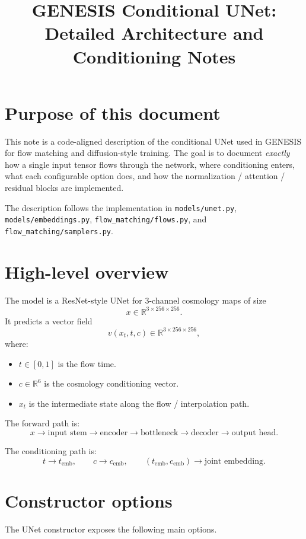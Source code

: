 \documentclass[11pt]{article}
\title{GENESIS Conditional UNet: Detailed Architecture and Conditioning Notes}
\author{}
\date{}
\begin{document}
\maketitle
\tableofcontents
\newpage

\section{Purpose of this document}
This note is a code-aligned description of the conditional UNet used in GENESIS for
flow matching and diffusion-style training. The goal is to document \emph{exactly}
how a single input tensor flows through the network, where conditioning enters,
what each configurable option does, and how the normalization / attention / residual
blocks are implemented.

The description follows the implementation in \texttt{models/unet.py},
\texttt{models/embeddings.py}, \texttt{flow\_matching/flows.py}, and
\texttt{flow\_matching/samplers.py}.

\section{High-level overview}
The model is a ResNet-style UNet for 3-channel cosmology maps of size
\[
x \in \mathbb{R}^{3 \times 256 \times 256}.
\]
It predicts a vector field
\[
v(x_t, t, c) \in \mathbb{R}^{3 \times 256 \times 256},
\]
where:
\begin{itemize}
  \item $t \in [0,1]$ is the flow time.
  \item $c \in \mathbb{R}^6$ is the cosmology conditioning vector.
  \item $x_t$ is the intermediate state along the flow / interpolation path.
\end{itemize}

The forward path is:
\[
x \to \text{input stem} \to \text{encoder} \to \text{bottleneck} \to \text{decoder} \to \text{output head}.
\]

The conditioning path is:
\[
t \to t_{\mathrm{emb}}, \qquad c \to c_{\mathrm{emb}}, \qquad
(t_{\mathrm{emb}}, c_{\mathrm{emb}}) \to \text{joint embedding}.
\]

\section{Constructor options}
The UNet constructor exposes the following main options.
\end{document}
